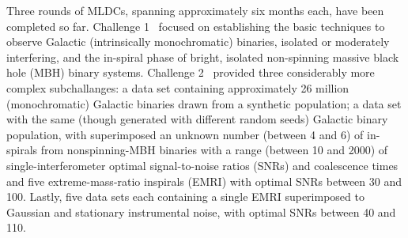 \documentclass{iopart}
\begin{document}
Three rounds of MLDCs, spanning approximately six months each, have been completed so far. Challenge 1~\cite{mldclisasymp,mldcgwdaw1} focused on establishing the basic techniques to observe Galactic (intrinsically monochromatic) binaries, isolated or moderately interfering, and the in-spiral phase of bright, isolated non-spinning massive black hole (MBH) binary systems. Challenge 2~\cite{mldcgwdaw2} provided three considerably more complex subchallanges: a data set containing approximately 26 million (monochromatic) Galactic binaries drawn from a synthetic population; a data set with the same (though generated with different random seeds) Galactic binary population, with superimposed an unknown number (between 4 and 6) of in-spirals from nonspinning-MBH binaries with a range (between 10 and 2000) of single-interferometer optimal signal-to-noise ratios (SNRs) and coalescence times and five extreme-mass-ratio inspirals (EMRI) with optimal SNRs between 30 and 100. Lastly, five data sets each containing a single EMRI superimposed to Gaussian and stationary instrumental noise, with optimal SNRs between 40 and 110.

\end{document}
